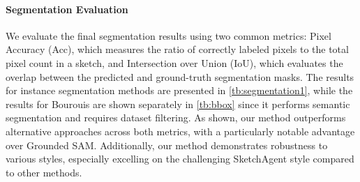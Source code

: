 \paragraph{Segmentation Evaluation}
We evaluate the final segmentation results using two common metrics: Pixel Accuracy (Acc), which measures the ratio of correctly labeled pixels to the total pixel count in a sketch, and  Intersection over Union (IoU), which evaluates the overlap between the predicted and ground-truth segmentation masks. The results for instance segmentation methods are presented in \cref{tb:segmentation1}, while the results for Bourouis \etal {} are shown separately in \cref{tb:bbox} since it performs semantic segmentation and requires dataset filtering. 
As shown, our method outperforms alternative approaches across both metrics, with a particularly notable advantage over Grounded SAM. Additionally, our method demonstrates robustness to various styles, especially excelling on the challenging SketchAgent style compared to other methods.









